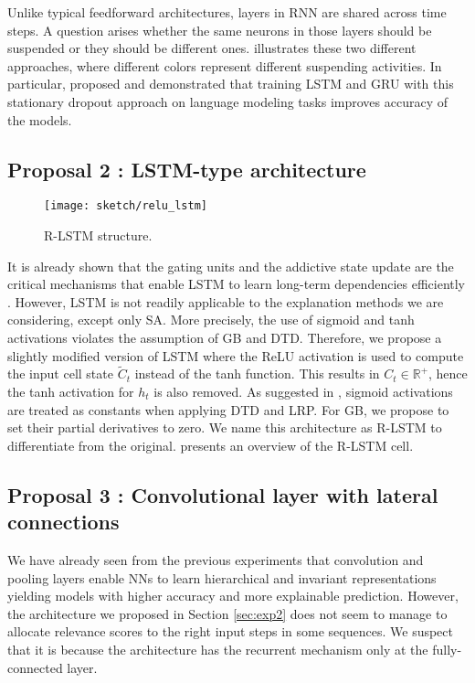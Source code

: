 Unlike typical feedforward architectures, layers in RNN are shared across time steps. A question arises whether the same neurons in those layers should be suspended or they should be different ones. \addfigure{\ref{fig:dropout_lstm}} illustrates these two different approaches, where different colors represent different suspending activities. In particular, \citet{GalTheoreticallyGroundedApplication2016} proposed and demonstrated that training LSTM and GRU with this stationary dropout approach on language modeling tasks improves accuracy of the models.


\subsection{Proposal 2 : LSTM-type architecture}
\begin{figure}[!htb]
\centering
\texttt{[image: sketch/relu\_lstm]}
\caption{R-LSTM structure.} 

\label{fig:relu_lstm} 
\end{figure}

It is already shown that the gating units and the addictive state update are the critical mechanisms that enable LSTM to learn long-term dependencies efficiently \citep{GreffLSTMsearchspace2017, JozefowiczEmpiricalExplorationRecurrent2015}. However, LSTM is not readily applicable to the explanation methods we are considering, except only SA. More precisely, the use of sigmoid and tanh activations violates the assumption of GB and DTD. Therefore, we propose a slightly modified version of LSTM where the ReLU activation is used to compute the  input cell state $\widetilde{C}_t$ instead of the tanh function. This results in $C_t \in \mathbb{R}^+$, hence the tanh activation for $h_t$  is also removed.  As suggested in \citep{ArrasExplainingRecurrentNeural2017},  sigmoid activations are treated as constants when applying DTD and LRP. For GB, we propose to set their partial derivatives to zero. We name this architecture as R-LSTM to differentiate from the original.  \addfigure{\ref{fig:relu_lstm}} presents an overview of the R-LSTM cell.


\subsection{Proposal 3 : Convolutional layer with lateral connections}
We have already seen from the previous experiments that convolution and pooling layers enable NNs to learn hierarchical and invariant representations yielding models with higher accuracy and more explainable prediction. However, the  architecture we proposed in Section \ref{sec:exp2} does not seem to manage to allocate relevance scores to the right input steps in some sequences. We suspect that it is because the architecture has the recurrent mechanism only at the fully-connected layer.


